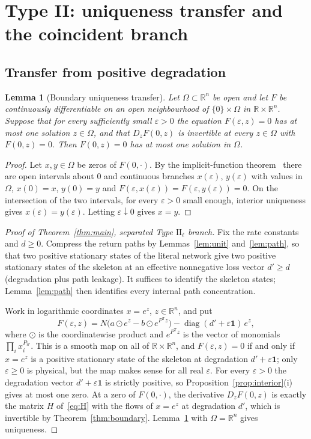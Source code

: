 \documentclass[11pt,a4paper]{article}
\theoremstyle{plain}
\newtheorem{lemma}[theorem]{Lemma}
\theoremstyle{definition}
\theoremstyle{remark}
\numberwithin{equation}{section}
\newcommand{\R}{\mathbb{R}}
\newcommand{\one}{\mathbf{1}}
\newcommand{\diag}{\operatorname{diag}}
\newcommand{\II}{\mathrm{II}}
\begin{document}
\section{Type II: uniqueness transfer and the coincident branch}\label{sec:finish}

\subsection{Transfer from positive degradation}

\begin{lemma}[Boundary uniqueness transfer]\label{lem:ift}
Let $\Omega\subset\R^n$ be open and let $F$ be continuously differentiable on an open neighbourhood of $\{0\}\times\Omega$ in $\R\times\R^n$. Suppose that for every sufficiently small $\varepsilon>0$ the equation $F(\varepsilon,z)=0$ has at most one solution $z\in\Omega$, and that $D_zF(0,z)$ is invertible at every $z\in\Omega$ with $F(0,z)=0$. Then $F(0,z)=0$ has at most one solution in $\Omega$.
\end{lemma}

\begin{proof}
Let $x,y\in\Omega$ be zeros of $F(0,\cdot)$. By the implicit-function theorem~\cite{KP02} there are open intervals about $0$ and continuous branches $x(\varepsilon)$, $y(\varepsilon)$ with values in $\Omega$, $x(0)=x$, $y(0)=y$ and $F(\varepsilon,x(\varepsilon))=F(\varepsilon,y(\varepsilon))=0$. On the intersection of the two intervals, for every $\varepsilon>0$ small enough, interior uniqueness gives $x(\varepsilon)=y(\varepsilon)$. Letting $\varepsilon\downarrow0$ gives $x=y$.
\end{proof}

\begin{proof}[Proof of Theorem~\ref{thm:main}, separated Type $\II_\ell$ branch]
Fix the rate constants and $d\ge0$. Compress the return paths by Lemmas~\ref{lem:unit} and~\ref{lem:path}, so that two positive stationary states of the literal network give two positive stationary states of the skeleton at an effective nonnegative loss vector $d'\ge d$ (degradation plus path leakage). It suffices to identify the skeleton states; Lemma~\ref{lem:path} then identifies every internal path concentration.

Work in logarithmic coordinates $x=e^z$, $z\in\R^n$, and put
\[
F(\varepsilon,z)=N\bigl(a\odot e^{z}-b\odot e^{P^{\mathsf T}z}\bigr)-\diag(d'+\varepsilon\one)\,e^{z},
\]
where $\odot$ is the coordinatewise product and $e^{P^{\mathsf T}z}$ is the vector of monomials $\prod_ix_i^{P_{ir}}$. This is a smooth map on all of $\R\times\R^n$, and $F(\varepsilon,z)=0$ if and only if $x=e^z$ is a positive stationary state of the skeleton at degradation $d'+\varepsilon\one$; only $\varepsilon\ge0$ is physical, but the map makes sense for all real $\varepsilon$. For every $\varepsilon>0$ the degradation vector $d'+\varepsilon\one$ is strictly positive, so Proposition~\ref{prop:interior}(i) gives at most one zero. At a zero of $F(0,\cdot)$, the derivative $D_zF(0,z)$ is exactly the matrix $H$ of~\eqref{eq:H} with the flows of $x=e^z$ at degradation $d'$, which is invertible by Theorem~\ref{thm:boundary}. Lemma~\ref{lem:ift} with $\Omega=\R^n$ gives uniqueness.
\end{proof}
\end{document}
